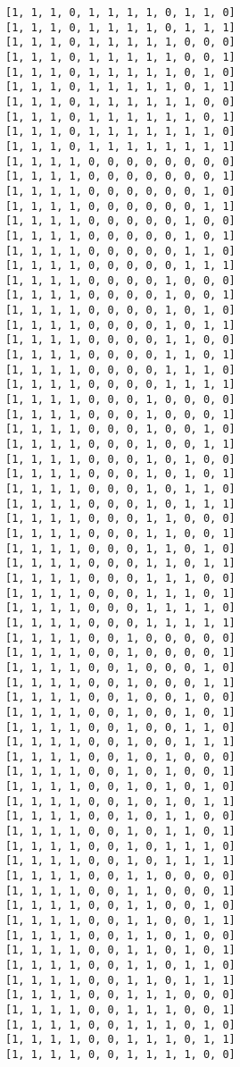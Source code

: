 \documentclass[11pt]{article}
\begin{document}
\begin{Verbatim}[commandchars=\\\{\}]
[1, 1, 1, 0, 1, 1, 1, 1, 0, 1, 1, 0]
[1, 1, 1, 0, 1, 1, 1, 1, 0, 1, 1, 1]
[1, 1, 1, 0, 1, 1, 1, 1, 1, 0, 0, 0]
[1, 1, 1, 0, 1, 1, 1, 1, 1, 0, 0, 1]
[1, 1, 1, 0, 1, 1, 1, 1, 1, 0, 1, 0]
[1, 1, 1, 0, 1, 1, 1, 1, 1, 0, 1, 1]
[1, 1, 1, 0, 1, 1, 1, 1, 1, 1, 0, 0]
[1, 1, 1, 0, 1, 1, 1, 1, 1, 1, 0, 1]
[1, 1, 1, 0, 1, 1, 1, 1, 1, 1, 1, 0]
[1, 1, 1, 0, 1, 1, 1, 1, 1, 1, 1, 1]
[1, 1, 1, 1, 0, 0, 0, 0, 0, 0, 0, 0]
[1, 1, 1, 1, 0, 0, 0, 0, 0, 0, 0, 1]
[1, 1, 1, 1, 0, 0, 0, 0, 0, 0, 1, 0]
[1, 1, 1, 1, 0, 0, 0, 0, 0, 0, 1, 1]
[1, 1, 1, 1, 0, 0, 0, 0, 0, 1, 0, 0]
[1, 1, 1, 1, 0, 0, 0, 0, 0, 1, 0, 1]
[1, 1, 1, 1, 0, 0, 0, 0, 0, 1, 1, 0]
[1, 1, 1, 1, 0, 0, 0, 0, 0, 1, 1, 1]
[1, 1, 1, 1, 0, 0, 0, 0, 1, 0, 0, 0]
[1, 1, 1, 1, 0, 0, 0, 0, 1, 0, 0, 1]
[1, 1, 1, 1, 0, 0, 0, 0, 1, 0, 1, 0]
[1, 1, 1, 1, 0, 0, 0, 0, 1, 0, 1, 1]
[1, 1, 1, 1, 0, 0, 0, 0, 1, 1, 0, 0]
[1, 1, 1, 1, 0, 0, 0, 0, 1, 1, 0, 1]
[1, 1, 1, 1, 0, 0, 0, 0, 1, 1, 1, 0]
[1, 1, 1, 1, 0, 0, 0, 0, 1, 1, 1, 1]
[1, 1, 1, 1, 0, 0, 0, 1, 0, 0, 0, 0]
[1, 1, 1, 1, 0, 0, 0, 1, 0, 0, 0, 1]
[1, 1, 1, 1, 0, 0, 0, 1, 0, 0, 1, 0]
[1, 1, 1, 1, 0, 0, 0, 1, 0, 0, 1, 1]
[1, 1, 1, 1, 0, 0, 0, 1, 0, 1, 0, 0]
[1, 1, 1, 1, 0, 0, 0, 1, 0, 1, 0, 1]
[1, 1, 1, 1, 0, 0, 0, 1, 0, 1, 1, 0]
[1, 1, 1, 1, 0, 0, 0, 1, 0, 1, 1, 1]
[1, 1, 1, 1, 0, 0, 0, 1, 1, 0, 0, 0]
[1, 1, 1, 1, 0, 0, 0, 1, 1, 0, 0, 1]
[1, 1, 1, 1, 0, 0, 0, 1, 1, 0, 1, 0]
[1, 1, 1, 1, 0, 0, 0, 1, 1, 0, 1, 1]
[1, 1, 1, 1, 0, 0, 0, 1, 1, 1, 0, 0]
[1, 1, 1, 1, 0, 0, 0, 1, 1, 1, 0, 1]
[1, 1, 1, 1, 0, 0, 0, 1, 1, 1, 1, 0]
[1, 1, 1, 1, 0, 0, 0, 1, 1, 1, 1, 1]
[1, 1, 1, 1, 0, 0, 1, 0, 0, 0, 0, 0]
[1, 1, 1, 1, 0, 0, 1, 0, 0, 0, 0, 1]
[1, 1, 1, 1, 0, 0, 1, 0, 0, 0, 1, 0]
[1, 1, 1, 1, 0, 0, 1, 0, 0, 0, 1, 1]
[1, 1, 1, 1, 0, 0, 1, 0, 0, 1, 0, 0]
[1, 1, 1, 1, 0, 0, 1, 0, 0, 1, 0, 1]
[1, 1, 1, 1, 0, 0, 1, 0, 0, 1, 1, 0]
[1, 1, 1, 1, 0, 0, 1, 0, 0, 1, 1, 1]
[1, 1, 1, 1, 0, 0, 1, 0, 1, 0, 0, 0]
[1, 1, 1, 1, 0, 0, 1, 0, 1, 0, 0, 1]
[1, 1, 1, 1, 0, 0, 1, 0, 1, 0, 1, 0]
[1, 1, 1, 1, 0, 0, 1, 0, 1, 0, 1, 1]
[1, 1, 1, 1, 0, 0, 1, 0, 1, 1, 0, 0]
[1, 1, 1, 1, 0, 0, 1, 0, 1, 1, 0, 1]
[1, 1, 1, 1, 0, 0, 1, 0, 1, 1, 1, 0]
[1, 1, 1, 1, 0, 0, 1, 0, 1, 1, 1, 1]
[1, 1, 1, 1, 0, 0, 1, 1, 0, 0, 0, 0]
[1, 1, 1, 1, 0, 0, 1, 1, 0, 0, 0, 1]
[1, 1, 1, 1, 0, 0, 1, 1, 0, 0, 1, 0]
[1, 1, 1, 1, 0, 0, 1, 1, 0, 0, 1, 1]
[1, 1, 1, 1, 0, 0, 1, 1, 0, 1, 0, 0]
[1, 1, 1, 1, 0, 0, 1, 1, 0, 1, 0, 1]
[1, 1, 1, 1, 0, 0, 1, 1, 0, 1, 1, 0]
[1, 1, 1, 1, 0, 0, 1, 1, 0, 1, 1, 1]
[1, 1, 1, 1, 0, 0, 1, 1, 1, 0, 0, 0]
[1, 1, 1, 1, 0, 0, 1, 1, 1, 0, 0, 1]
[1, 1, 1, 1, 0, 0, 1, 1, 1, 0, 1, 0]
[1, 1, 1, 1, 0, 0, 1, 1, 1, 0, 1, 1]
[1, 1, 1, 1, 0, 0, 1, 1, 1, 1, 0, 0]

\end{Verbatim}
\end{document}
